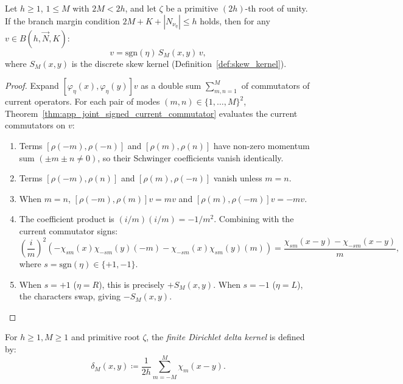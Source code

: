 \begin{theorem}
\label{thm:app_chiral_same_commutator}
Let $h \ge 1$, $1 \le M$ with $2M < 2h$, and let $\zeta$ be a primitive $(2h)$-th root of unity. If the branch margin condition $2M + K + |N_{\nu_\eta}| \le h$ holds, then for any $v \in B(h, \vec{N}, K)$:
\begin{equation}
[\varphi_\eta(x), \varphi_\eta(y)] v = \mathrm{sgn}(\eta)\, S_M(x, y)\, v,
\end{equation}
where $S_M(x, y)$ is the discrete skew kernel (Definition~\ref{def:skew_kernel}).
\end{theorem}

\begin{proof}
Expand $[\varphi_\eta(x), \varphi_\eta(y)] v$ as a double sum $\sum_{m, n = 1}^M$ of commutators of current operators.
For each pair of modes $(m, n) \in \{1, \dots, M\}^2$, Theorem~\ref{thm:app_joint_signed_current_commutator} evaluates the current commutators on $v$:
\begin{enumerate}
    \item Terms $[\rho(-m), \rho(-n)]$ and $[\rho(m), \rho(n)]$ have non-zero momentum sum $(\pm m \pm n \neq 0)$, so their Schwinger coefficients vanish identically.
    \item Terms $[\rho(-m), \rho(n)]$ and $[\rho(m), \rho(-n)]$ vanish unless $m = n$.
    \item When $m = n$, $[\rho(-m), \rho(m)] v = m v$ and $[\rho(m), \rho(-m)] v = -m v$.
    \item The coefficient product is $(i/m)(i/m) = -1/m^2$. Combining with the current commutator signs:
    \[
    \left( \frac{i}{m} \right)^2 \left( - \chi_{s m}(x) \chi_{-s m}(y) (-m) - \chi_{-s m}(x) \chi_{s m}(y) (m) \right) = \frac{\chi_{s m}(x - y) - \chi_{-s m}(x - y)}{m},
    \]
    where $s = \mathrm{sgn}(\eta) \in \{+1, -1\}$.
    \item When $s = +1$ ($\eta = R$), this is precisely $+S_M(x, y)$. When $s = -1$ ($\eta = L$), the characters swap, giving $-S_M(x, y)$.
\end{enumerate}
\end{proof}

\begin{definition}
For $h \ge 1, M \ge 1$ and primitive root $\zeta$, the \emph{finite Dirichlet delta kernel} is defined by:
\begin{equation}
\delta_M(x, y) \coloneqq \frac{1}{2h} \sum_{m = -M}^M \chi_m(x - y).
\end{equation}
\end{definition}

